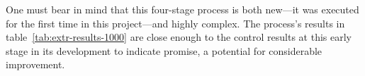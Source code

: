 {One must bear in mind that this four-stage process is both new---it was executed for the first time in this project---and highly complex. The process's results in table~\ref{tab:extr-results-1000} are close enough to 
the control results at this early stage in its development to indicate promise, a potential for considerable improvement.




}
